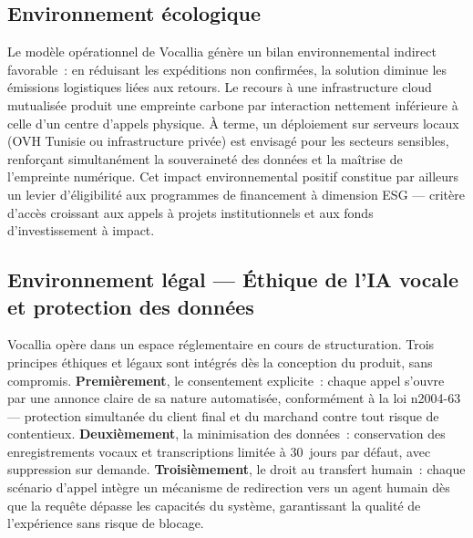 \subsection{Environnement écologique}
\label{section2.1.5}

Le modèle opérationnel de Vocallia génère un bilan environnemental indirect favorable~: en réduisant les expéditions non confirmées, la solution diminue les émissions logistiques liées aux retours. Le recours à une infrastructure cloud mutualisée produit une empreinte carbone par interaction nettement inférieure à celle d'un centre d'appels physique. À terme, un déploiement sur serveurs locaux (OVH Tunisie ou infrastructure privée) est envisagé pour les secteurs sensibles, renforçant simultanément la souveraineté des données et la maîtrise de l'empreinte numérique. Cet impact environnemental positif constitue par ailleurs un levier d'éligibilité aux programmes de financement à dimension ESG --- critère d'accès croissant aux appels à projets institutionnels et aux fonds d'investissement à impact.

\subsection{Environnement légal --- Éthique de l'IA vocale et protection des données}
\label{section2.1.6}

Vocallia opère dans un espace réglementaire en cours de structuration. Trois principes éthiques et légaux sont intégrés dès la conception du produit, sans compromis. \textbf{Premièrement}, le consentement explicite~: chaque appel s'ouvre par une annonce claire de sa nature automatisée, conformément à la loi n\degre{}2004-63 --- protection simultanée du client final et du marchand contre tout risque de contentieux. \textbf{Deuxièmement}, la minimisation des données~: conservation des enregistrements vocaux et transcriptions limitée à 30~jours par défaut, avec suppression sur demande. \textbf{Troisièmement}, le droit au transfert humain~: chaque scénario d'appel intègre un mécanisme de redirection vers un agent humain dès que la requête dépasse les capacités du système, garantissant la qualité de l'expérience sans risque de blocage.

